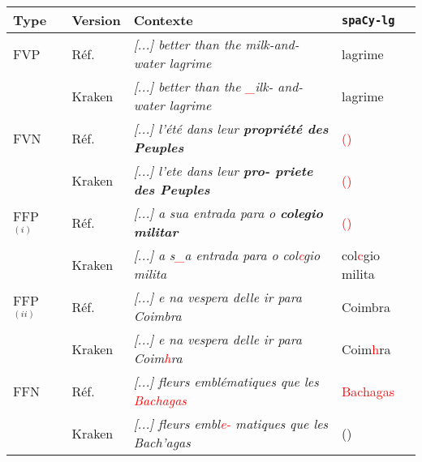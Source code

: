 
\scriptsize{
\begin{tabular}{|l|l|l|l|}
\hline
Type &Version & Contexte & \texttt{spaCy-lg} \\
\hline
\hline
FVP&Réf. &\textit{[...] better than the milk-and-water lagrime}& lagrime\\
&Kraken &\textit{[...] better than the \textcolor{red}{\_}ilk-
and-water lagrime}& lagrime \\
\hline
FVN&Réf. & \textit{[...] l'été dans leur \textbf{propriété des Peuples}}& \textcolor{red}{()} \\
&Kraken &\textit{[...] l'ete dans leur \textbf{pro-
priete des Peuples}}& \textcolor{red}{()} \\
\hline
\hline
FFP $^{(i)}$&Réf. &\textit{[...] a sua entrada para o \textbf{colegio militar}}& \textcolor{red}{()} \\
&Kraken &\textit{[...] a s\textcolor{red}{\_}a entrada para
o col\textcolor{red}{c}gio milita}& col\textcolor{red}{c}gio milita \\
FFP $^{(ii)}$&Réf. & \textit{[...] e na vespera delle ir para Coimbra}
&Coimbra \\
&Kraken & \textit{[...] e na vespera delle ir para Coim\textcolor{red}{h}ra} &Coim\textcolor{red}{h}ra \\
\hline
FFN&Réf. & \textit{[...] fleurs emblématiques que les \textcolor{red}{Bachagas}}& \textcolor{red}{Bachagas} \\
&Kraken & \textit{[...] fleurs embl\textcolor{red}{e-}
matiques que les Bach'agas}& () \\
\hline
\end{tabular}}


